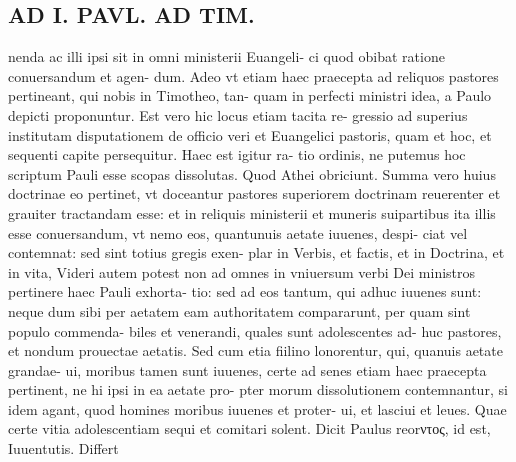 \documentclass{article}
\begin{document}
\begin{pages}
\section*{AD I. PAVL. AD TIM. }
\marginpar{[ p.228 ]}\pstart nenda ac illi ipsi sit in omni ministerii Euangeli- ci quod obibat ratione conuersandum et agen- dum. Adeo vt etiam haec praecepta ad reliquos pastores pertineant, qui nobis in Timotheo, tan- quam in perfecti ministri idea, a Paulo depicti proponuntur. Est vero hic locus etiam tacita re- gressio ad superius institutam disputationem de officio veri et Euangelici pastoris, quam et hoc, et sequenti capite persequitur. Haec est igitur ra- tio ordinis, ne putemus hoc scriptum Pauli esse scopas dissolutas. Quod Athei obriciunt. Summa vero huius doctrinae eo pertinet, vt doceantur pastores superiorem doctrinam reuerenter et grauiter tractandam esse: et in reliquis ministerii et muneris suipartibus ita illis esse conuersandum, vt nemo eos, quantunuis aetate iuuenes, despi- ciat vel contemnat: sed sint totius gregis exen- plar in Verbis, et factis, et in Doctrina, et in vita, Videri autem potest non ad omnes in vniuersum verbi Dei ministros pertinere haec Pauli exhorta- tio: sed ad eos tantum, qui adhuc iuuenes sunt: neque dum sibi per aetatem eam authoritatem compararunt, per quam sint populo commenda- biles et venerandi, quales sunt adolescentes ad- huc pastores, et nondum prouectae aetatis. Sed cum etia fiilino lonorentur, qui, quanuis aetate grandae- ui, moribus tamen sunt iuuenes, certe ad senes etiam haec praecepta pertinent, ne hi ipsi in ea aetate pro- pter morum dissolutionem contemnantur, si idem agant, quod homines moribus iuuenes et proter- ui, et lasciui et leues. Quae certe vitia adolescentiam sequi et comitari solent. Dicit Paulus reorντος, id est, Iuuentutis. Differt  \pend

\end{pages}
\end{document}
